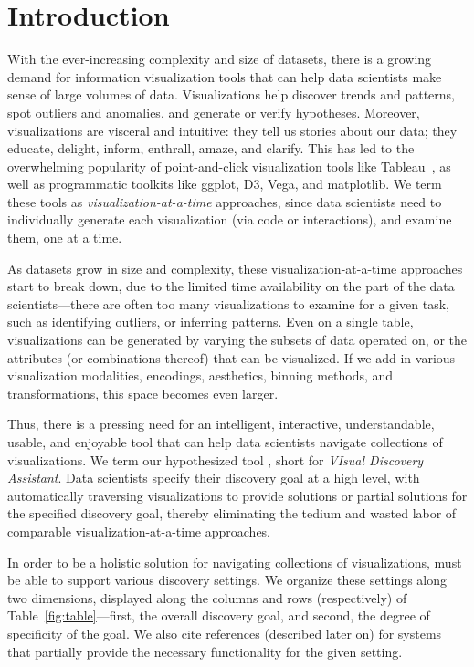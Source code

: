 \section{Introduction}%

\par 
With the ever-increasing complexity 
and size of datasets,
there is a growing demand for 
information visualization tools
that can help data scientists make sense of large
volumes of data.
Visualizations help discover 
trends and patterns, 
spot outliers and anomalies, 
and generate or verify hypotheses.
Moreover, 
visualizations are visceral and intuitive: 
they tell us stories about our data; 
they educate, delight, inform, 
enthrall, amaze, and clarify.
This has led to the overwhelming popularity
of point-and-click visualization tools like Tableau~\cite{Stolte2002},
as well as programmatic toolkits like ggplot, D3, Vega, and matplotlib. 
We term these tools as {\em visualization-at-a-time} approaches, since
data scientists need to individually 
generate each visualization (via code or interactions),
and examine them, 
one at a time.


\par
As datasets grow in size and complexity, 
these visualization-at-a-time approaches start to break down,
due to the limited time availability on the 
part of the data scientists---there 
are often too many visualizations to examine for a given 
task, such as identifying outliers, or inferring patterns. 
Even on a single table, 
visualizations can be generated
by varying the subsets of data operated on, 
or the attributes (or combinations
thereof) that can be visualized. 
If we add in various visualization modalities, encodings,
aesthetics, binning methods, and transformations,
this space becomes even larger.


\par
Thus, there is a pressing need for an 
intelligent,
interactive, understandable, usable, and
enjoyable tool that can help 
data scientists navigate
collections of visualizations.
We term our hypothesized tool \vida,
short for {\em VIsual Discovery Assistant}.
Data scientists specify their discovery
goal at a high level,
with \vida 
automatically 
traversing visualizations to provide
solutions or partial solutions for the
specified discovery goal, thereby
eliminating the tedium and wasted
labor of comparable visualization-at-a-time 
approaches.

\par
{} In order to be a holistic solution for 
navigating collections of visualizations,
\vida must be able to support various discovery
settings. 
We organize these settings along two
dimensions, displayed along the columns and rows (respectively) of Table~\ref{fig:table}---first, the overall discovery goal,
and second, the degree of specificity of the goal.
We also cite references (described later on)
for systems that partially provide the necessary
functionality for the given setting.

